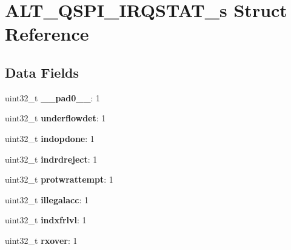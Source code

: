 \hypertarget{structALT__QSPI__IRQSTAT__s}{}\section{A\+L\+T\+\_\+\+Q\+S\+P\+I\+\_\+\+I\+R\+Q\+S\+T\+A\+T\+\_\+s Struct Reference}
\label{structALT__QSPI__IRQSTAT__s}
\subsection*{Data Fields}
\begin{DoxyCompactItemize}
\item 
\mbox{\label{structALT__QSPI__IRQSTAT__s_ab407b7d7eb9c26c3f6af478a7d56aa5a}} 
uint32\+\_\+t {\bfseries \+\_\+\+\_\+pad0\+\_\+\+\_\+}\+: 1
\item 
\mbox{\label{structALT__QSPI__IRQSTAT__s_ab53fc2d826f591d2165e30445612ee83}} 
uint32\+\_\+t {\bfseries underflowdet}\+: 1
\item 
\mbox{\label{structALT__QSPI__IRQSTAT__s_a79d16eb104c201ad0fea030132a86ffa}} 
uint32\+\_\+t {\bfseries indopdone}\+: 1
\item 
\mbox{\label{structALT__QSPI__IRQSTAT__s_a079b21adaa1bf5fa70584902915b792b}} 
uint32\+\_\+t {\bfseries indrdreject}\+: 1
\item 
\mbox{\label{structALT__QSPI__IRQSTAT__s_a28feea81c9a7c438fb5f7f8b448a9630}} 
uint32\+\_\+t {\bfseries protwrattempt}\+: 1
\item 
\mbox{\label{structALT__QSPI__IRQSTAT__s_a95526402b527983726e3ae894d0fcce4}} 
uint32\+\_\+t {\bfseries illegalacc}\+: 1
\item 
\mbox{\label{structALT__QSPI__IRQSTAT__s_ab959df3427547a3ed8c57529423265c2}} 
uint32\+\_\+t {\bfseries indxfrlvl}\+: 1
\item 
\mbox{\label{structALT__QSPI__IRQSTAT__s_a735340b62ae3d270672a2079b0556597}} 
uint32\+\_\+t {\bfseries rxover}\+: 1
\item 

\end{DoxyCompactItemize}
